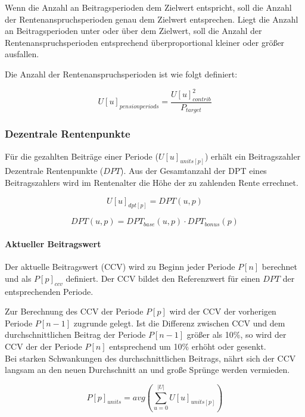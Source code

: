 Wenn die Anzahl an Beitragsperioden dem Zielwert entspricht, soll die Anzahl der 
Rentenanspruchsperioden genau dem Zielwert entsprechen. Liegt die  Anzahl an
Beitragsperioden unter oder über dem Zielwert, soll die Anzahl der 
Rentenanspruchsperioden entsprechend überproportional kleiner oder größer ausfallen.  

Die Anzahl der Rentenanspruchsperioden ist wie folgt definiert:

\begin{equation}
U[u]_{pensionperiods} = \frac{U[u]_{contrib}^2}{P_{target}}
\end{equation}


\subsubsection*{Dezentrale Rentenpunkte}
Für die gezahlten Beiträge einer Periode ($U[u]_{units[p]}$) erhält ein Beitragszahler Dezentrale Rentenpunkte
($DPT$). Aus der Gesamtanzahl der DPT eines Beitragszahlers wird im Rentenalter
die Höhe der zu zahlenden Rente errechnet.

\begin{equation}
U[u]_{dpt[p]} = DPT(u, p)
\end{equation}

\begin{equation}
DPT(u, p) = DPT_{base}(u, p) \cdot DPT_{bonus}(p)
\end{equation}

\paragraph*{Aktueller Beitragswert}
Der aktuelle Beitragswert (CCV) wird zu Beginn jeder Periode 
$P[n]$ berechnet und als $P[p]_{ccv}$ definiert. Der CCV bildet den Referenzwert für einen $DPT$ der
entsprechenden Periode.

Zur Berechnung des CCV der Periode $P[p]$ wird der CCV der vorherigen
Periode $P[n-1]$ zugrunde gelegt. Ist die Differenz zwischen CCV und dem
durchschnittlichen Beitrag der Periode $P[n-1]$ größer als 10\%, so wird
der CCV der der Periode $P[n]$ entsprechend um 10\% erhöht oder gesenkt.\\
Bei starken Schwankungen des durchschnittlichen Beitrags, nährt sich der CCV langsam an den neuen Durchschnitt an und große Sprünge werden vermieden.


\begin{equation}
P[p]_{units} = avg(\sum_{u=0}^{|U|} U[u]_{units[p]})
\end{equation}


